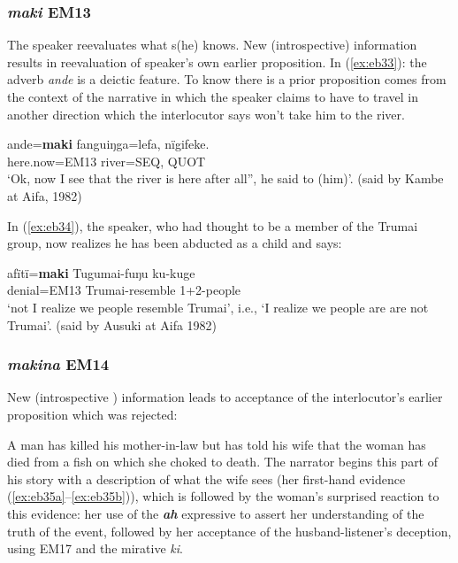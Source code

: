 \documentclass[output=paper]{langsci/langscibook}
\begin{document}
\subsubsection{\textit{maki} EM13} 
The speaker reevaluates what s(he) knows.  New (introspective) information results in reevaluation of speaker’s own earlier proposition.  In (\ref{ex:eb33}): the adverb \textit{ande} is a deictic feature. To know there is a prior proposition comes from  the context of the narrative in which the speaker claims to have to travel in another direction which the interlocutor says won’t take him to the river.

\begin{exe}
	\ex \label{ex:eb33}
	\gll ande=\textbf{maki} fanguiŋga=lefa, nïgifeke.\\
	here.now=EM13 river=SEQ, QUOT\\
	\trans ‘Ok, now I see that the river is here after all”, he said to (him)’. (said by Kambe at Aifa, 1982)
\end{exe}

In (\ref{ex:eb34}), the speaker, who had thought to be a member of the Trumai group, now realizes he has been abducted as a child and says: 

\begin{exe}
	\ex \label{ex:eb34}
	\gll afïtï=\textbf{maki} Tugumai-fuŋu ku-kuge\\
	denial=EM13 Trumai-resemble 1+2-people\\
	\trans ‘not I realize we people resemble Trumai’, i.e., ‘I realize we people are are not Trumai’. (said by Ausuki at Aifa 1982)
\end{exe}

\subsubsection{\textit{makina} EM14} New (introspective ) information leads to acceptance of the interlocutor’s earlier proposition which was rejected: 

A man has killed his mother-in-law but has told his wife that the woman has died from a fish on which she choked to death.  The narrator begins this part of his story with a description of what the wife sees (her first-hand evidence (\ref{ex:eb35a}--\ref{ex:eb35b})), which is followed by the woman’s surprised reaction to this evidence:  her  use of the \textbf{\textit{ah}} expressive to assert her understanding of the truth of the event, followed by her acceptance of the husband-listener’s deception,  using EM17 and the mirative \textit{ki}.
\end{document}
